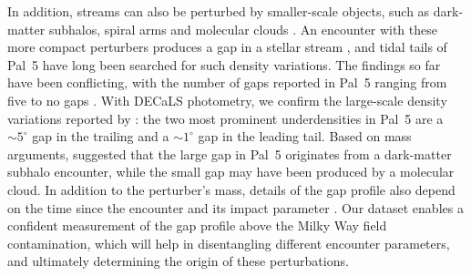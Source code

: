 \documentclass[twocolumn]{aastex62}
\newcommand{\ab}[1]{{\color{teal} AB: #1}}
\begin{document}
In addition, streams can also be perturbed by smaller-scale objects, such as dark-matter subhalos, spiral arms and molecular clouds \citep[e.g.,][]{Yoon:2011,Amorisco:2016, Banik:2019}.
An encounter with these more compact perturbers produces a gap in a stellar stream \citep[e.g.,][]{Johnston:2002,Ibata:2002}, and tidal tails of Pal~5 have long been searched for such density variations.
The findings so far have been conflicting, with the number of gaps reported in Pal~5 ranging from five \citep{Carlberg:2012} to no gaps \citep{Ibata:2016}.
With DECaLS photometry, we confirm the large-scale density variations reported by \citet{Erkal:2017}: the two most prominent underdensities in Pal~5 are a $\sim5^\circ$ gap in the trailing and a $\sim1^\circ$ gap in the leading tail.
Based on mass arguments, \citet{Erkal:2017} suggested that the large gap in Pal~5 originates from a dark-matter subhalo encounter, while the small gap may have been produced by a molecular cloud.
In addition to the perturber's mass, details of the gap profile also depend on the time since the encounter and its impact parameter \citep{Erkal:2015}.
Our dataset enables a confident measurement of the gap profile above the Milky Way field contamination, which will help in disentangling different encounter parameters, and ultimately determining the origin of these perturbations.
\end{document}
